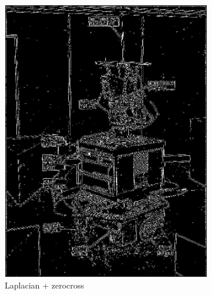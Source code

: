 \documentclass[lettersize,journal]{IEEEtran}
\begin{document}
\begin{figure}[h]
    \centering 
     
    \begin{subfigure}[h]{0.23\textwidth}
        \centering 
        \includegraphics[width=\linewidth]{laplacian_zerocross}
        \caption{Laplacian + zerocross}  
    \end{subfigure}
    \begin{subfigure}[h]{0.23\textwidth}
        \centering

\end{subfigure}
\end{figure}
\end{document}
